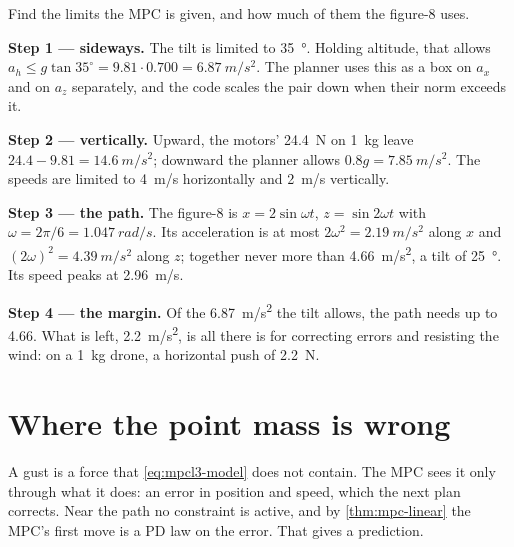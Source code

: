 \begin{example}
\label{ex:mpcl3-budget}
Find the limits the MPC is given, and how much of them the figure-8 uses.

\textbf{Step 1 — sideways.} The tilt is limited to \SI{35}{\degree}. Holding altitude, that allows $a_h \le g\tan 35^\circ = 9.81 \cdot 0.700 = \SI{6.87}{m/s^2}$. The planner uses this as a box on $a_x$ and on $a_z$ separately, and the code scales the pair down when their norm exceeds it.

\textbf{Step 2 — vertically.} Upward, the motors' \SI{24.4}{N} on \SI{1}{kg} leave $24.4 - 9.81 = \SI{14.6}{m/s^2}$; downward the planner allows $0.8g = \SI{7.85}{m/s^2}$. The speeds are limited to \SI{4}{m/s} horizontally and \SI{2}{m/s} vertically.

\textbf{Step 3 — the path.} The figure-8 is $x = 2\sin\omega t$, $z = \sin 2\omega t$ with $\omega = 2\pi/6 = \SI{1.047}{rad/s}$. Its acceleration is at most $2\omega^2 = \SI{2.19}{m/s^2}$ along $x$ and $(2\omega)^2 = \SI{4.39}{m/s^2}$ along $z$; together never more than \SI{4.66}{m/s^2}, a tilt of \SI{25}{\degree}. Its speed peaks at \SI{2.96}{m/s}.

\textbf{Step 4 — the margin.} Of the \SI{6.87}{m/s^2} the tilt allows, the path needs up to 4.66. What is left, \SI{2.2}{m/s^2}, is all there is for correcting errors and resisting the wind: on a \SI{1}{kg} drone, a horizontal push of \SI{2.2}{N}.
\end{example}

\section{Where the point mass is wrong}

A gust is a force that \cref{eq:mpcl3-model} does not contain. The MPC sees it only through what it does: an error in position and speed, which the next plan corrects. Near the path no constraint is active, and by \cref{thm:mpc-linear} the MPC's first move is a PD law on the error. That gives a prediction.

